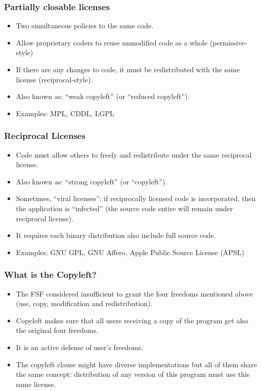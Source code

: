 \documentclass{beamer}
\begin{document}

\begin{frame}
\frametitle{Partially closable licenses}

\begin{itemize}
\item Two simultaneous policies to the same code.
\item Allow proprietary coders to reuse unmodified code as a whole (permissive-style)
\item If there are any changes to code, it must be redistributed with the same license (reciprocal-style).
\item Also known as: ``weak copyleft'' (or ``reduced copyleft''). 
\pause
\item \alert{Examples}: MPL, CDDL, LGPL
\end{itemize}

\end{frame}


\begin{frame}
\frametitle{Reciprocal Licenses}

\begin{itemize}
\item Code must allow others to freely and redistribute under the same reciprocal license.
\item Also known as: ``strong copyleft'' (or ``copyleft''). 
\item Sometimes, ``viral licenses'': if reciprocally licensed code is incorporated, then the application is ``infected'' (the source code entire will remain under reciprocal license).  
\item It requires each binary distribution also include full source code.
\pause
\item \alert{Examples}: GNU GPL, GNU Affero, Apple Public Source License (APSL)
\end{itemize}

\end{frame}

\begin{frame}
\frametitle{What is the Copyleft?}
\pause
\begin{itemize}
    \item The FSF considered insufficient to grant the four freedoms mentioned above (use, copy, modification and redistribution).         
    \item Copyleft makes sure that all users receiving a copy of the program get also the original four freedoms.
    \item It is an active defense of user's freedoms. 
    \item The \alert{copyleft clause} might have diverse implementations but all of them share the same concept: \alert{distribution of any version of this program must use this same license.}

\end{itemize}

\end{frame}
\end{document}
